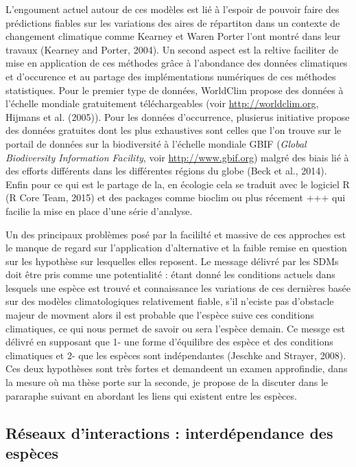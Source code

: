 L'engoument actuel autour de ces modèles est lié à l'espoir de pouvoir
faire des prédictions fiables sur les variations des aires de répartiton
dans un contexte de changement climatique comme Kearney et Waren Porter
l'ont montré dans leur travaux (Kearney and Porter, 2004). Un second
aspect est la reltive faciliter de mise en application de ces méthodes
grâce à l'abondance des données climatiques et d'occurence et au partage
des implémentations numériques de ces méthodes statistiques. Pour le
premier type de données, WorldClim propose des données à l'échelle
mondiale gratuitement téléchargeables (voir \url{http://worldclim.org},
Hijmans et al. (2005)). Pour les données d'occurrence, plusierus
initiative propose des données gratuites dont les plus exhaustives sont
celles que l'on trouve sur le portail de données sur la biodiversité à
l'échelle mondiale GBIF (\emph{Global Biodiversity Information
Facility}, voir \url{http://www.gbif.org}) malgré des biais lié à des
efforts différents dans les différentes régions du globe (Beck et al.,
2014). Enfin pour ce qui est le partage de la, en écologie cela se
traduit avec le logiciel R (R Core Team, 2015) et des packages comme
bioclim ou plus récement +++ qui facilie la mise en place d'une série
d'analyse.

Un des principaux problèmes posé par la facililté et massive de ces
approches est le manque de regard sur l'application d'alternative et la
faible remise en question sur les hypothèse sur lesquelles elles
reposent. Le message délivré par les SDMs doit être pris comme une
potentialité : étant donné les conditions actuels dans lesquels une
espèce est trouvé et connaissance les variations de ces dernières basée
sur des modèles climatologiques relativement fiable, s'il n'eciste pas
d'obstacle majeur de movment alors il est probable que l'espèce suive
ces conditions climatiques, ce qui nous permet de savoir ou sera
l'espèce demain. Ce messge est délivré en supposant que 1- une forme
d'équilibre des espèce et des conditions climatiques et 2- que les
espèces sont indépendantes (Jeschke and Strayer, 2008). Ces deux
hypothèses sont très fortes et demandeent un examen approfindie, dans la
mesure où ma thèse porte sur la seconde, je propose de la discuter dans
le pararaphe suivant en abordant les liens qui existent entre les
espèces.

\subsection*{Réseaux d'interactions : interdépendance des
espèces}\label{ruxe9seaux-dinteractions-interduxe9pendance-des-espuxe8ces}

